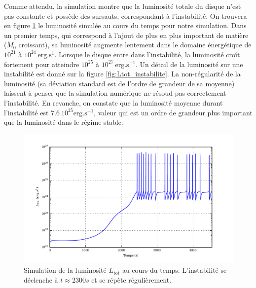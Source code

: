 Comme attendu, la simulation montre que la luminosité totale du disque n'est pas constante et possède des sursauts, correspondant à l'instabilité. On trouvera en figure \ref{fig:Ltot_function_t} le luminosité simulée au cours du temps pour notre simulation. Dans un premier temps, qui correspond à l'ajout de plus en plus important de matière ($\dot{M}_0$ croissant), sa luminosité augmente lentement dans le domaine énergétique de $10^{21}$ à $10^{24}\ \mathrm{erg.s^{1}}$. Lorsque le disque entre dans l'instabilité, la luminosité croît fortement pour atteindre $10^{25}$ à $10^{27}\ \mathrm{erg.s^{-1}}$. Un détail de la luminosité sur une instabilité est donné sur la figure \ref{fig:Ltot_instabilite}. La non-régularité de la luminosité (sa déviation standard est de l'ordre de grandeur de sa moyenne) laissent à penser que la simulation numérique ne résoud pas correctement l'instabilité. En revanche, on constate que la luminosité moyenne durant l'instabilité est $7.6\ 10^{25}\mathrm{erg.s^{-1}}$, valeur qui est un ordre de grandeur plus important que la luminosité dans le régime stable.
\begin{figure}
  \includegraphics{figures/Ltot_fonction_t.pdf}
  \caption{Simulation de la luminosité $L_\mathrm{tot}$ au cours du temps. L'instabilité se déclenche à $t \approx 2300s$ et se répète régulièrement.}
  \label{fig:Ltot_function_t}
\end{figure}

